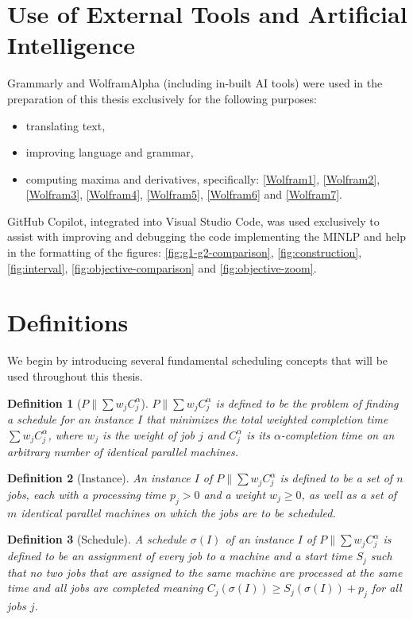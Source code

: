 \documentclass[%
english, titlepage=false %
]{./tum-templates/book/tumbook}
\newtheorem{definition}{Definition}
\begin{document}
\section*{Use of External Tools and Artificial Intelligence}

Grammarly and WolframAlpha (including in-built AI tools) were used in the preparation of this thesis
exclusively for the following purposes:
\begin{itemize}
    \item translating text,
    \item improving language and grammar,
    \item computing maxima and derivatives, specifically: \eqref{Wolfram1}, \eqref{Wolfram2}, \eqref{Wolfram3}, \eqref{Wolfram4}, \eqref{Wolfram5}, \eqref{Wolfram6} and \eqref{Wolfram7}.
\end{itemize}

GitHub Copilot, integrated into Visual Studio Code, was used exclusively to assist
with improving and debugging the code implementing the MINLP and help in the formatting of
the figures: \ref{fig:g1-g2-comparison}, \ref{fig:construction}, \ref{fig:interval}, \ref{fig:objective-comparison} and \ref{fig:objective-zoom}.

\section{Definitions}
We begin by introducing several fundamental scheduling concepts that will be used throughout this thesis.

\begin{definition}[$P \!\parallel\! \sum w_j C_j^{\alpha}$]
    $P \!\parallel\! \sum w_j C_j^{\alpha}$ is defined to be the problem of
    finding a schedule for an instance $I$ that minimizes the total weighted completion time $\sum w_j C_j^{\alpha}$, where $w_j$ is the weight of job $j$ and
    $C_j^{\alpha}$ is its $\alpha$-completion time on an arbitrary number of identical parallel machines.
\end{definition}

\begin{definition}[Instance]
    An instance $I$ of $P \!\parallel\!\sum w_j C_j^{\alpha}$ is defined to be a set of $n$ jobs, each with a processing time $p_j > 0$ and a weight $w_j \ge 0$, as well as a set of $m$ identical parallel machines on which the jobs are to be scheduled.
\end{definition}

\begin{definition}[Schedule]
    A schedule $\sigma(I)$ of an instance $I$ of $P \!\parallel\!\sum w_j C_j^{\alpha}$ is defined to be an assignment of every job to a machine and a start time $S_j$ such that no two jobs that are
    assigned to the same machine are processed at the same time and all jobs are completed meaning $C_j(\sigma(I)) \ge S_j(\sigma(I)) + p_j$ for all jobs $j$.
\end{definition}
\end{document}
